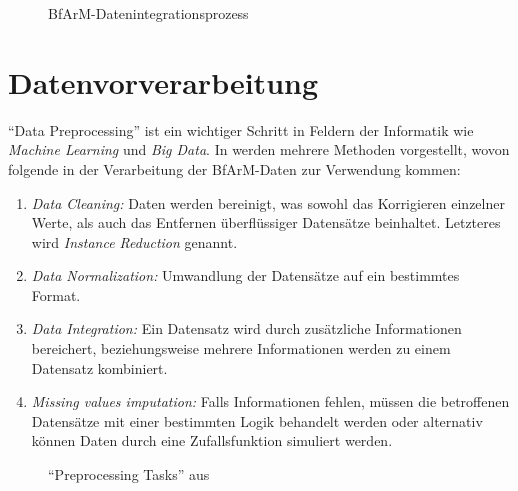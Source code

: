 \begin{figure}[H]
    \centering\large
    \resizebox{.9\textwidth}{!}{}
    \normalsize\caption{BfArM-Datenintegrationsprozess}
    \label{bfarm-data-int}
\end{figure}

\section{Datenvorverarbeitung}

"`Data Preprocessing"' ist ein wichtiger Schritt in Feldern der Informatik wie \emph{Machine Learning} und \emph{Big Data}. In \cite{garcia2016big} werden mehrere Methoden vorgestellt, wovon folgende in der Verarbeitung der BfArM-Daten zur Verwendung kommen:

\begin{enumerate}
\item \emph{Data Cleaning:} Daten werden bereinigt, was sowohl das Korrigieren einzelner Werte, als auch das Entfernen überflüssiger Datensätze beinhaltet. Letzteres wird \emph{Instance Reduction} genannt. 
\item \emph{Data Normalization:} Umwandlung der Datensätze auf ein bestimmtes Format. 
\item \emph{Data Integration:} Ein Datensatz wird durch zusätzliche Informationen bereichert, beziehungsweise mehrere Informationen werden zu einem Datensatz kombiniert. 
\item \emph{Missing values imputation:} Falls Informationen fehlen, müssen die betroffenen Datensätze mit einer bestimmten Logik behandelt werden oder alternativ können Daten durch eine Zufallsfunktion simuliert werden. 
\end{enumerate}

\begin{figure}[H]
    \centering
    \setlength{\fboxsep}{.03\linewidth}\color{black!20}
    \normalcolor\caption{"`Preprocessing Tasks"' aus \cite[Seite 4]{garcia2016big}}
\end{figure}

